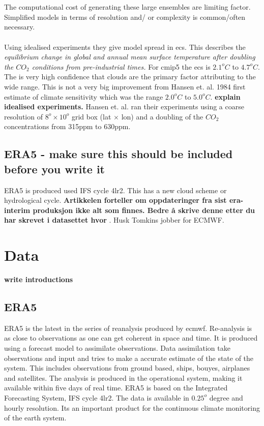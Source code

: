 \\ \\
The computational cost of generating these large ensembles are limiting factor. Simplified models in terms of resolution and/ or complexity is common/often necessary. 
\\ \\ 
Using idealised experiments they give model spread in \acrfull{ecs}. This describes the \textit{equilibrium change in global and annual mean surface temperature after doubling the $CO_2$ conditions from pre-industrial times.} For \acrshort{cmip5} the \acrshort{ecs} is $2.1^oC$ to $4.7^oC$. The is very high confidence that clouds are the primary factor attributing to the wide range. This is not a very big improvement from Hansen et. al. 1984 first estimate of climate sensitivity which was the range $2.0^oC$ to $5.0^oC$. \textbf{explain idealised experiments.} Hansen et. al. ran their experiments using a coarse resolution of $8^o \times 10^o$ grid box (lat $\times$ lon) and a doubling of the $CO_2$ concentrations from 315ppm to 630ppm. 

\subsection{ERA5 - make sure this should be included before you write it} \label{sec:param_ERA5}
ERA5 is produced used IFS cycle 4lr2. This has a new cloud scheme or hydrological cycle. \textbf{Artikkelen forteller om oppdateringer fra sist era-interim produksjon ikke alt som finnes. Bedre å skrive denne etter du har skrevet i datasettet hvor }. Husk Tomkins jobber for ECMWF.

\section{Data}
\textbf{write introductions}


\subsection{ERA5} \label{sec:era5}
ERA5 is the latest in the series of reanalysis produced by \acrfull{ecmwf}. Re-analysis is as close to observations as one can get coherent in space and time. It is produced using a forecast model to assimilate observations. Data assimilation take observations and input and tries to make a accurate estimate of the state of the system. This includes observations from ground based, ships, bouyes, airplanes and satellites. The analysis is produced in the operational system, making it available within five days of real time. ERA5 is based on the Integrated Forecasting System, IFS cycle 4lr2. The data is available in $0.25^o$ degree and hourly resolution. Its an important product for the continuous climate monitoring of the earth system. 

